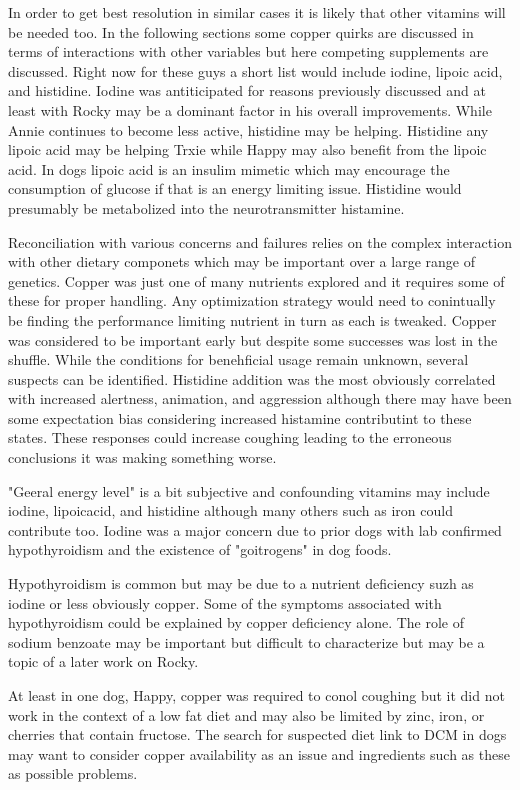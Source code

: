 In order to get best resolution in similar cases it is likely
that other vitamins will be needed too. In the following sections
some copper quirks are discussed in terms of interactions with
other variables but here competing supplements are discussed.
Right now for these guys a short list would include iodine,
lipoic acid, and histidine. Iodine was antiticipated for
reasons previously discussed and at least with Rocky may 
be a dominant factor in his overall improvements. While
Annie continues to become less active, histidine may be
helping. Histidine any lipoic acid may be helping Trxie
while Happy may also benefit from the lipoic acid. In dogs lipoic
acid is  an insulim mimetic which may encourage the consumption
of glucose if that is an energy limiting issue. 
Histidine would presumably be metabolized into the neurotransmitter
histamine. 


Reconciliation with various concerns and failures
relies on the complex interaction with other dietary componets
which may be important over a large range of genetics. 
Copper was just one of many nutrients explored and
it requires some of these for proper handling.
Any optimization strategy would need to conintually
be finding the performance limiting nutrient
in turn as each is tweaked. 
Copper was considered to be important early but despite
some successes was lost in the shuffle. While the conditions
for benehficial usage remain unknown, several suspects
can be identified. Histidine addition was the most
obviously correlated with increased
alertness, animation, and aggression although there
may have been some expectation bias considering increased
histamine contributint to these states. These responses
could increase coughing leading to the erroneous
conclusions it was making something worse.    

"Geeral energy level" is a bit subjective and 
confounding vitamins may include iodine, lipoicacid,
and histidine although many others such as iron could
contribute too. Iodine was a major concern due to
prior dogs with lab confirmed hypothyroidism and the
existence of "goitrogens" in dog foods. 

Hypothyroidism is common but may be due to a nutrient
deficiency suzh as iodine or less obviously copper.
Some of the symptoms associated with hypothyroidism
could be explained by copper deficiency alone.
The role of sodium benzoate may be important but
difficult to characterize  but may be a topic of a later
work on Rocky.

At least in one dog, Happy, copper was required to conol
coughing but it did not work in the context of a low fat
diet and may also be limited by zinc, iron, or cherries
that contain fructose.  The search for suspected diet link to
DCM in dogs may want to consider copper availability as an
issue and ingredients such as these as possible problems.


